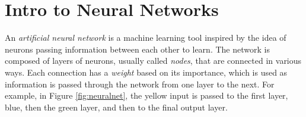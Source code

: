 

\newcommand{\lieq}[1]{{\text{\li{#1}}}}

\section*{Intro to Neural Networks}


An \emph{artificial neural network} is a machine learning tool inspired by the idea of neurons passing information between each other to learn.
The network is composed of layers of neurons, usually called \emph{nodes}, that are connected in various ways.
Each connection has a \emph{weight} based on its importance, which is used as information is passed through the network from one layer to the next.
For example, in Figure \ref{fig:neuralnet}, the yellow input is passed to the first layer, blue, then the green layer, and then to the final output layer.


